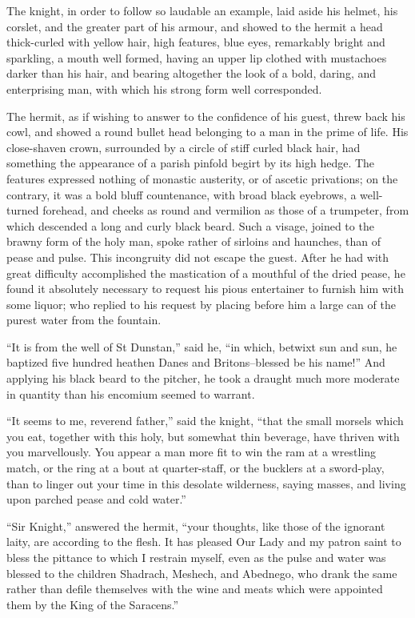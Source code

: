 The knight, in order to follow so laudable an example, laid aside his
helmet, his corslet, and the greater part of his armour, and showed to
the hermit a head thick-curled with yellow hair, high features, blue
eyes, remarkably bright and sparkling, a mouth well formed, having an
upper lip clothed with mustachoes darker than his hair, and bearing
altogether the look of a bold, daring, and enterprising man, with which
his strong form well corresponded.

The hermit, as if wishing to answer to the confidence of his guest,
threw back his cowl, and showed a round bullet head belonging to a man
in the prime of life. His close-shaven crown, surrounded by a circle of
stiff curled black hair, had something the appearance of a parish
pinfold begirt by its high hedge. The features expressed nothing of
monastic austerity, or of ascetic privations; on the contrary, it was a
bold bluff countenance, with broad black eyebrows, a well-turned
forehead, and cheeks as round and vermilion as those of a trumpeter,
from which descended a long and curly black beard. Such a visage, joined
to the brawny form of the holy man, spoke rather of sirloins and
haunches, than of pease and pulse. This incongruity did not escape the
guest. After he had with great difficulty accomplished the mastication
of a mouthful of the dried pease, he found it absolutely necessary to
request his pious entertainer to furnish him with some liquor; who
replied to his request by placing before him a large can of the purest
water from the fountain.

``It is from the well of St Dunstan,'' said he, ``in which, betwixt sun
and sun, he baptized five hundred heathen Danes and Britons--blessed be
his name!'' And applying his black beard to the pitcher, he took a
draught much more moderate in quantity than his encomium seemed to
warrant.

``It seems to me, reverend father,'' said the knight, ``that the small
morsels which you eat, together with this holy, but somewhat thin
beverage, have thriven with you marvellously. You appear a man more fit
to win the ram at a wrestling match, or the ring at a bout at
quarter-staff, or the bucklers at a sword-play, than to linger out your
time in this desolate wilderness, saying masses, and living upon parched
pease and cold water.''

``Sir Knight,'' answered the hermit, ``your thoughts, like those of the
ignorant laity, are according to the flesh. It has pleased Our Lady and
my patron saint to bless the pittance to which I restrain myself, even
as the pulse and water was blessed to the children Shadrach, Meshech,
and Abednego, who drank the same rather than defile themselves with the
wine and meats which were appointed them by the King of the Saracens.''

